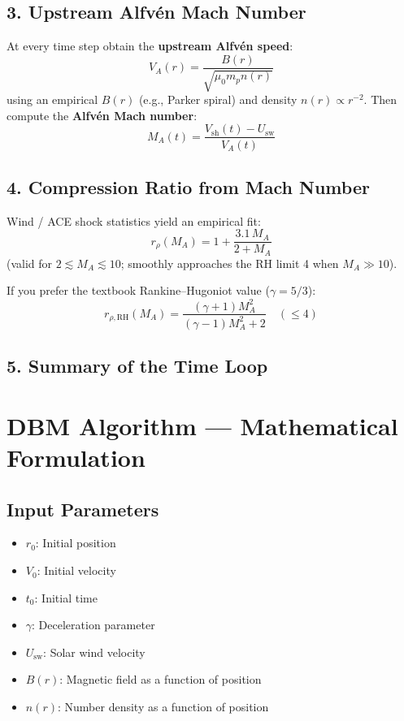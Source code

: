 \subsection*{3. Upstream Alfv\'{e}n Mach Number}

At every time step obtain the \textbf{upstream Alfv\'{e}n speed}:
\[
V_A(r) = \frac{B(r)}{\sqrt{\mu_0 m_p n(r)}}
\]
using an empirical $B(r)$ (e.g., Parker spiral) and density $n(r) \propto r^{-2}$. Then compute the \textbf{Alfv\'{e}n Mach number}:
\[
M_A(t) = \frac{V_{\text{sh}}(t) - U_{\text{sw}}}{V_A(t)}
\]

\subsection*{4. Compression Ratio from Mach Number}

Wind / ACE shock statistics yield an empirical fit:
\[
\boxed{\; r_{\rho}(M_A) = 1 + \frac{3.1\,M_A}{2 + M_A} \;}
\]
(valid for $2 \lesssim M_A \lesssim 10$; smoothly approaches the RH limit 4 when $M_A \gg 10$).

If you prefer the textbook Rankine--Hugoniot value ($\gamma = 5/3$):
\[
r_{\rho,\mathrm{RH}}(M_A) = \frac{(\gamma+1)M_A^2}{(\gamma-1)M_A^2+2} \quad (\le 4)
\]

\subsection*{5. Summary of the Time Loop}
\section*{DBM Algorithm — Mathematical Formulation}

\subsection*{Input Parameters}
\begin{itemize}
  \item $r_0$: Initial position
  \item $V_0$: Initial velocity
  \item $t_0$: Initial time
  \item $\gamma$: Deceleration parameter
  \item $U_{\mathrm{sw}}$: Solar wind velocity
  \item $B(r)$: Magnetic field as a function of position
  \item $n(r)$: Number density as a function of position
\end{itemize}

